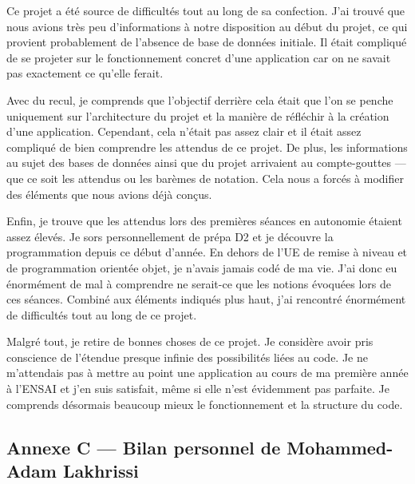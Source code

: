 \documentclass[12pt,a4paper]{article}
\begin{document}
\begin{bilanbox}
Ce projet a été source de difficultés tout au long de sa confection. J'ai trouvé que nous
avions très peu d'informations à notre disposition au début du projet, ce qui provient
probablement de l'absence de base de données initiale. Il était compliqué de se projeter sur
le fonctionnement concret d'une application car on ne savait pas exactement ce qu'elle ferait.

\medskip
Avec du recul, je comprends que l'objectif derrière cela était que l'on se penche uniquement
sur l'architecture du projet et la manière de réfléchir à la création d'une application.
Cependant, cela n'était pas assez clair et il était assez compliqué de bien comprendre les
attendus de ce projet. De plus, les informations au sujet des bases de données ainsi que du
projet arrivaient au compte-gouttes --- que ce soit les attendus ou les barèmes de notation.
Cela nous a forcés à modifier des éléments que nous avions déjà conçus.

\medskip
Enfin, je trouve que les attendus lors des premières séances en autonomie étaient assez élevés.
Je sors personnellement de prépa D2 et je découvre la programmation depuis ce début d'année.
En dehors de l'UE de remise à niveau et de programmation orientée objet, je n'avais jamais
codé de ma vie. J'ai donc eu énormément de mal à comprendre ne serait-ce que les notions
évoquées lors de ces séances. Combiné aux éléments indiqués plus haut, j'ai rencontré
énormément de difficultés tout au long de ce projet.

\medskip
Malgré tout, je retire de bonnes choses de ce projet. Je considère avoir pris conscience de
l'étendue presque infinie des possibilités liées au code. Je ne m'attendais pas à mettre au
point une application au cours de ma première année à l'ENSAI et j'en suis satisfait, même si
elle n'est évidemment pas parfaite. Je comprends désormais beaucoup mieux le fonctionnement
et la structure du code.
\end{bilanbox}

\subsection*{Annexe C --- Bilan personnel de Mohammed-Adam Lakhrissi}
\end{document}
